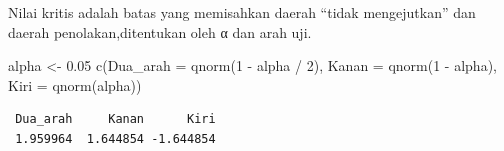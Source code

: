 \documentclass[
  indonesian,
  letterpaper,
]{book}
\newenvironment{Shaded}{\begin{snugshade}}{\end{snugshade}}
\newcommand{\AttributeTok}[1]{\textcolor[rgb]{0.40,0.45,0.13}{#1}}
\newcommand{\DecValTok}[1]{\textcolor[rgb]{0.68,0.00,0.00}{#1}}
\newcommand{\FloatTok}[1]{\textcolor[rgb]{0.68,0.00,0.00}{#1}}
\newcommand{\FunctionTok}[1]{\textcolor[rgb]{0.28,0.35,0.67}{#1}}
\newcommand{\NormalTok}[1]{\textcolor[rgb]{0.00,0.23,0.31}{#1}}
\newcommand{\OtherTok}[1]{\textcolor[rgb]{0.00,0.23,0.31}{#1}}
\newcommand{\SpecialCharTok}[1]{\textcolor[rgb]{0.37,0.37,0.37}{#1}}
\begin{document}
Nilai kritis adalah batas yang memisahkan daerah ``tidak mengejutkan''
dan daerah penolakan,ditentukan oleh α dan arah uji.

\begin{Shaded}
\begin{Highlighting}[]
\NormalTok{alpha }\OtherTok{\textless{}{-}} \FloatTok{0.05}
\FunctionTok{c}\NormalTok{(}\AttributeTok{Dua\_arah =} \FunctionTok{qnorm}\NormalTok{(}\DecValTok{1} \SpecialCharTok{{-}}\NormalTok{ alpha }\SpecialCharTok{/} \DecValTok{2}\NormalTok{), }\AttributeTok{Kanan =} \FunctionTok{qnorm}\NormalTok{(}\DecValTok{1} \SpecialCharTok{{-}}\NormalTok{ alpha), }\AttributeTok{Kiri =} \FunctionTok{qnorm}\NormalTok{(alpha))}
\end{Highlighting}
\end{Shaded}

\begin{verbatim}
 Dua_arah     Kanan      Kiri 
 1.959964  1.644854 -1.644854 
\end{verbatim}
\end{document}

